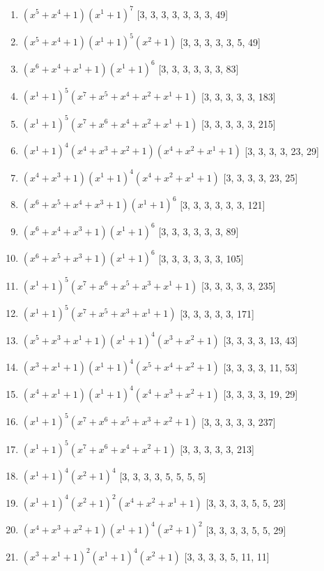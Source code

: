 \documentclass[10pt,twocolumn]{article}
\begin{document}
\begin{enumerate}
\item $(x^{5} + x^{4} + 1)(x^{1} + 1)^{7}$  [3, 3, 3, 3, 3, 3, 3, 49]
\item $(x^{5} + x^{4} + 1)(x^{1} + 1)^{5}(x^{2} + 1)$  [3, 3, 3, 3, 3, 5, 49]
\item $(x^{6} + x^{4} + x^{1} + 1)(x^{1} + 1)^{6}$  [3, 3, 3, 3, 3, 3, 83]
\item $(x^{1} + 1)^{5}(x^{7} + x^{5} + x^{4} + x^{2} + x^{1} + 1)$  [3, 3, 3, 3, 3, 183]
\item $(x^{1} + 1)^{5}(x^{7} + x^{6} + x^{4} + x^{2} + x^{1} + 1)$  [3, 3, 3, 3, 3, 215]
\item $(x^{1} + 1)^{4}(x^{4} + x^{3} + x^{2} + 1)(x^{4} + x^{2} + x^{1} + 1)$  [3, 3, 3, 3, 23, 29]
\item $(x^{4} + x^{3} + 1)(x^{1} + 1)^{4}(x^{4} + x^{2} + x^{1} + 1)$  [3, 3, 3, 3, 23, 25]
\item $(x^{6} + x^{5} + x^{4} + x^{3} + 1)(x^{1} + 1)^{6}$  [3, 3, 3, 3, 3, 3, 121]
\item $(x^{6} + x^{4} + x^{3} + 1)(x^{1} + 1)^{6}$  [3, 3, 3, 3, 3, 3, 89]
\item $(x^{6} + x^{5} + x^{3} + 1)(x^{1} + 1)^{6}$  [3, 3, 3, 3, 3, 3, 105]
\item $(x^{1} + 1)^{5}(x^{7} + x^{6} + x^{5} + x^{3} + x^{1} + 1)$  [3, 3, 3, 3, 3, 235]
\item $(x^{1} + 1)^{5}(x^{7} + x^{5} + x^{3} + x^{1} + 1)$  [3, 3, 3, 3, 3, 171]
\item $(x^{5} + x^{3} + x^{1} + 1)(x^{1} + 1)^{4}(x^{3} + x^{2} + 1)$  [3, 3, 3, 3, 13, 43]
\item $(x^{3} + x^{1} + 1)(x^{1} + 1)^{4}(x^{5} + x^{4} + x^{2} + 1)$  [3, 3, 3, 3, 11, 53]
\item $(x^{4} + x^{1} + 1)(x^{1} + 1)^{4}(x^{4} + x^{3} + x^{2} + 1)$  [3, 3, 3, 3, 19, 29]
\item $(x^{1} + 1)^{5}(x^{7} + x^{6} + x^{5} + x^{3} + x^{2} + 1)$  [3, 3, 3, 3, 3, 237]
\item $(x^{1} + 1)^{5}(x^{7} + x^{6} + x^{4} + x^{2} + 1)$  [3, 3, 3, 3, 3, 213]
\item $(x^{1} + 1)^{4}(x^{2} + 1)^{4}$  [3, 3, 3, 3, 5, 5, 5, 5]
\item $(x^{1} + 1)^{4}(x^{2} + 1)^{2}(x^{4} + x^{2} + x^{1} + 1)$  [3, 3, 3, 3, 5, 5, 23]
\item $(x^{4} + x^{3} + x^{2} + 1)(x^{1} + 1)^{4}(x^{2} + 1)^{2}$  [3, 3, 3, 3, 5, 5, 29]
\item $(x^{3} + x^{1} + 1)^{2}(x^{1} + 1)^{4}(x^{2} + 1)$  [3, 3, 3, 3, 5, 11, 11]

\end{enumerate}
\end{document}
